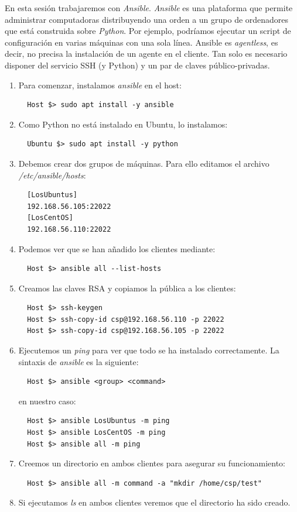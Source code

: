 \documentclass[12pt,spanish]{article}
\begin{document}
En esta sesión trabajaremos con \textit{Ansible}. \textit{Ansible} es una plataforma que permite administrar computadoras distribuyendo una orden a un grupo de ordenadores que está construida sobre \textit{Python}. Por ejemplo, podríamos ejecutar un script de configuración en varias máquinas con una sola línea. Ansible es \textit{agentless}, es decir, no precisa la instalación de un agente en el cliente. Tan solo es necesario disponer del servicio SSH (y Python) y un par de claves público-privadas.
\begin{enumerate}
  \item Para comenzar, instalamos \textit{ansible} en el host:
  \begin{lstlisting}
  Host $> sudo apt install -y ansible
  \end{lstlisting}
  \item Como Python no está instalado en Ubuntu, lo instalamos:
  \begin{lstlisting}
  Ubuntu $> sudo apt install -y python
  \end{lstlisting}
  \item Debemos crear dos grupos de máquinas. Para ello editamos el archivo \textit{/etc/ansible/hosts}:
  \begin{lstlisting}
  [LosUbuntus]
  192.168.56.105:22022
  [LosCentOS]
  192.168.56.110:22022
  \end{lstlisting}
  \item Podemos ver que se han añadido los clientes mediante:
  \begin{lstlisting}
  Host $> ansible all --list-hosts
  \end{lstlisting}
  \item Creamos las claves RSA y copiamos la pública a los clientes:
  \begin{lstlisting}
  Host $> ssh-keygen
  Host $> ssh-copy-id csp@192.168.56.110 -p 22022
  Host $> ssh-copy-id csp@192.168.56.105 -p 22022
  \end{lstlisting}
  \item Ejecutemos un \textit{ping} para ver que todo se ha instalado correctamente. La sintaxis de \textit{ansible} es la siguiente:
  \begin{lstlisting}
  Host $> ansible <group> <command>
  \end{lstlisting}
  en nuestro caso:
  \begin{lstlisting}
  Host $> ansible LosUbuntus -m ping
  Host $> ansible LosCentOS -m ping
  Host $> ansible all -m ping
  \end{lstlisting}
  \item Creemos un directorio en ambos clientes para asegurar su funcionamiento:
  \begin{lstlisting}
  Host $> ansible all -m command -a "mkdir /home/csp/test"
  \end{lstlisting}
  \item Si ejecutamos \textit{ls} en ambos clientes veremos que el directorio ha sido creado.
\end{enumerate}
\end{document}
